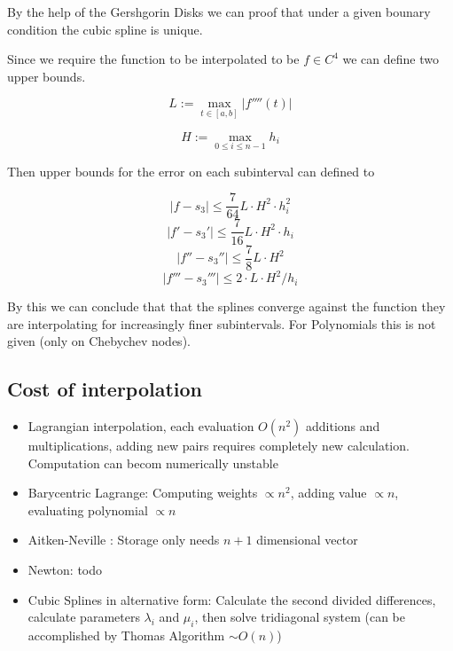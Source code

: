 \documentclass[
    a4paper,
    11pt
]{article}
\begin{document}
By the help of the Gershgorin Disks we can proof that under a given bounary
condition the cubic spline is unique.

Since we require the function to be interpolated to be $f \in \mathit{C}^4$ we
can define two upper bounds.

\begin{equation}
    L := \max_{t \in [a,b]} | f''''(t)|
\end{equation}

\begin{equation}
    H := \max_{0 \leq i \leq n-1} h_i
\end{equation}

Then upper bounds for the error on each subinterval can defined to

\begin{equation}
    |f - s_3| \leq \frac{7}{64} L \cdot H^2 \cdot h_i^2
\end{equation}
\begin{equation}
    |f' - s_3'| \leq \frac{7}{16} L \cdot H^2 \cdot h_i
\end{equation}
\begin{equation}
    |f'' - s_3''| \leq \frac{7}{8} L \cdot H^2 
\end{equation}
\begin{equation}
    |f''' - s_3'''| \leq 2 \cdot L \cdot H^2 / h_i
\end{equation}

By this we can conclude that that the splines converge against the function they
are interpolating for increasingly finer subintervals. For Polynomials this is
not given (only on Chebychev nodes).

\subsection{Cost of interpolation}

\begin{itemize}
    \item Lagrangian interpolation, each evaluation $O(n^2)$ additions and
        multiplications, adding new pairs requires completely new calculation.
        Computation can becom numerically unstable
    \item Barycentric Lagrange: Computing weights $\propto n^2$, adding value
        $\propto n$, evaluating polynomial $\propto n$
    \item Aitken-Neville : Storage only needs $n+1$ dimensional vector
    \item Newton: todo
    \item Cubic Splines in alternative form: Calculate the second divided
        differences, calculate parameters $\lambda_i$ and $\mu_i$, then solve
        tridiagonal system (can be accomplished by Thomas Algorithm $\sim O(n)$)
\end{itemize}
\end{document}
